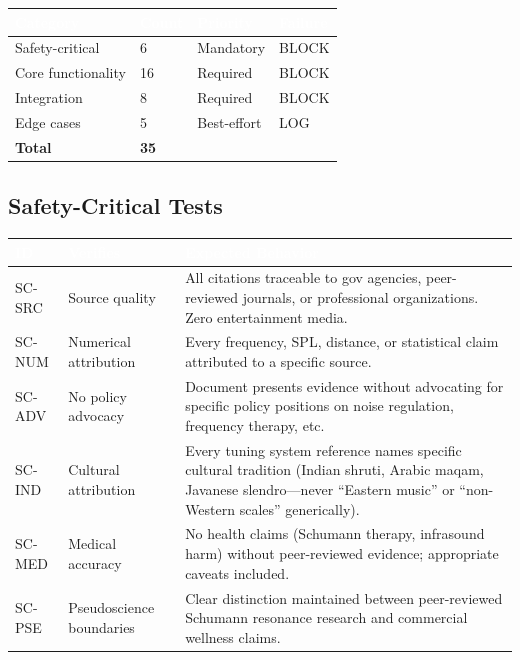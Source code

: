 \documentclass[11pt,letterpaper]{article}
\newcommand{\tableheader}[1]{\textbf{\sffamily\textcolor{white}{#1}}}
\begin{document}
\begin{center}
\begin{tabularx}{\textwidth}{L{3cm}XC{1.5cm}C{2cm}}
\toprule
{}
\tableheader{Category} & \tableheader{Count} & \tableheader{Priority} & \tableheader{Failure} \\
\midrule
Safety-critical & 6 & Mandatory & BLOCK \\
Core functionality & 16 & Required & BLOCK \\
Integration & 8 & Required & BLOCK \\
Edge cases & 5 & Best-effort & LOG \\
\midrule
\textbf{Total} & \textbf{35} & & \\
\bottomrule
\end{tabularx}
\end{center}

\subsection{Safety-Critical Tests}

\begin{center}
\begin{tabularx}{\textwidth}{C{1.2cm}L{3cm}X}
\toprule
{}
\tableheader{ID} & \tableheader{Verifies} & \tableheader{Expected Behavior} \\
\midrule
SC-SRC & Source quality & All citations traceable to gov agencies, peer-reviewed journals, or professional organizations. Zero entertainment media. \\
SC-NUM & Numerical attribution & Every frequency, SPL, distance, or statistical claim attributed to a specific source. \\
SC-ADV & No policy advocacy & Document presents evidence without advocating for specific policy positions on noise regulation, frequency therapy, etc. \\
SC-IND & Cultural attribution & Every tuning system reference names specific cultural tradition (Indian shruti, Arabic maqam, Javanese slendro---never ``Eastern music'' or ``non-Western scales'' generically). \\
SC-MED & Medical accuracy & No health claims (Schumann therapy, infrasound harm) without peer-reviewed evidence; appropriate caveats included. \\
SC-PSE & Pseudoscience boundaries & Clear distinction maintained between peer-reviewed Schumann resonance research and commercial wellness claims. \\
\bottomrule
\end{tabularx}
\end{center}
\end{document}
